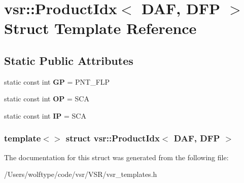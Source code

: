 \hypertarget{structvsr_1_1_product_idx_3_01_d_a_f_00_01_d_f_p_01_4}{\section{vsr\-:\-:Product\-Idx$<$ D\-A\-F, D\-F\-P $>$ Struct Template Reference}
\label{structvsr_1_1_product_idx_3_01_d_a_f_00_01_d_f_p_01_4}
}
\subsection*{Static Public Attributes}
\begin{DoxyCompactItemize}
\item 
\hypertarget{structvsr_1_1_product_idx_3_01_d_a_f_00_01_d_f_p_01_4_a85a3dfd91ccf35ae27fcee9fd65654d8}{static const int {\bfseries G\-P} = P\-N\-T\-\_\-\-F\-L\-P}\label{structvsr_1_1_product_idx_3_01_d_a_f_00_01_d_f_p_01_4_a85a3dfd91ccf35ae27fcee9fd65654d8}

\item 
\hypertarget{structvsr_1_1_product_idx_3_01_d_a_f_00_01_d_f_p_01_4_af376a290c4f5fe97650c3f415d9eacc2}{static const int {\bfseries O\-P} = S\-C\-A}\label{structvsr_1_1_product_idx_3_01_d_a_f_00_01_d_f_p_01_4_af376a290c4f5fe97650c3f415d9eacc2}

\item 
\hypertarget{structvsr_1_1_product_idx_3_01_d_a_f_00_01_d_f_p_01_4_ace086b388d0261031ee9af22fae5da58}{static const int {\bfseries I\-P} = S\-C\-A}\label{structvsr_1_1_product_idx_3_01_d_a_f_00_01_d_f_p_01_4_ace086b388d0261031ee9af22fae5da58}

\end{DoxyCompactItemize}
\subsubsection*{template$<$$>$ struct vsr\-::\-Product\-Idx$<$ D\-A\-F, D\-F\-P $>$}



The documentation for this struct was generated from the following file\-:\begin{DoxyCompactItemize}
\item 
/\-Users/wolftype/code/vsr/\-V\-S\-R/vsr\-\_\-templates.\-h\end{DoxyCompactItemize}

